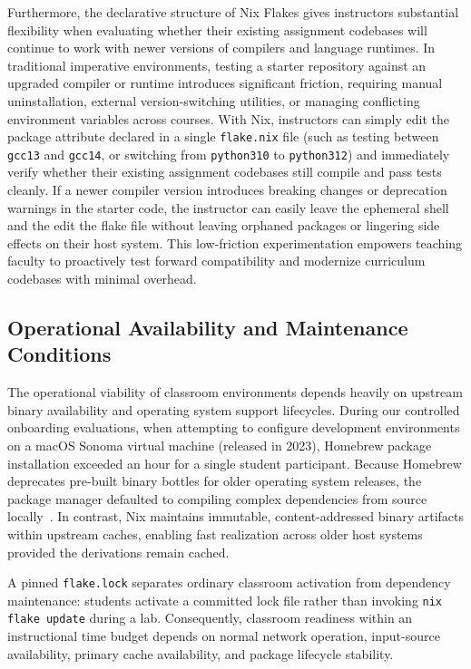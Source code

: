Furthermore, the declarative structure of Nix Flakes gives instructors substantial
flexibility when evaluating whether their existing assignment codebases will continue
to work with newer versions of compilers and language runtimes. In traditional
imperative environments, testing a starter repository against an upgraded compiler
or runtime introduces significant friction, requiring manual uninstallation, external
version-switching utilities, or managing conflicting environment variables
across courses. With Nix, instructors can simply edit the package attribute
declared in a single \texttt{flake.nix} file (such as testing between \texttt{gcc13}
and \texttt{gcc14}, or switching from \texttt{python310} to \texttt{python312})
and immediately verify whether their existing assignment codebases still compile
and pass tests cleanly. If a newer compiler version introduces breaking changes or
deprecation warnings in the starter code, the instructor can easily leave the
ephemeral shell and the edit the flake file without leaving orphaned packages or
lingering side effects on their host system. This low-friction experimentation empowers
teaching faculty to proactively test forward compatibility and modernize curriculum
codebases with minimal overhead.

\subsection{Operational Availability and Maintenance Conditions}

The operational viability of classroom environments depends heavily on upstream
binary availability and operating system support lifecycles. During our controlled
onboarding evaluations, when attempting to configure development environments on
a macOS Sonoma virtual machine (released in 2023), Homebrew package installation exceeded
an hour for a single student participant. Because Homebrew deprecates pre-built
binary bottles for older operating system releases, the package manager defaulted
to compiling complex dependencies from source locally~\cite{FAQFrequentlyAsked}.
In contrast, Nix maintains immutable, content-addressed binary artifacts within
upstream caches, enabling fast realization across older host systems provided the
derivations remain cached.

A pinned \texttt{flake.lock} separates ordinary classroom activation from
dependency maintenance: students activate a committed lock file rather than invoking
\texttt{nix flake update} during a lab. Consequently, classroom readiness within
an instructional time budget depends on normal network operation, input-source availability,
primary cache availability, and package lifecycle stability.


